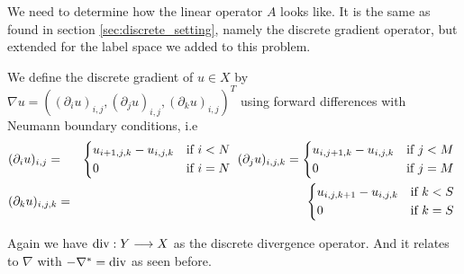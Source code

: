     We need to determine how the linear operator $A$ looks like. It is the same as found in section \ref{sec:discrete_setting}, namely the discrete gradient operator, but extended for the label space we added to this problem.

    \begin{definition} %
    \label{def:discrete_gradient_operator_ms}

        We define the discrete gradient of $u \in X$ by $\nabla u = ((\partial_{i}u)_{i, j}, (\partial_{j}u)_{i, j}, (\partial_{k}u)_{i, j})^{T}$ using forward differences with Neumann boundary conditions, i.e
            \begin{eqnarray}
                &(\partial_{i}u)_{i, j} =&
                    \begin{dcases*}
                        u_{i+1, j, k} - u_{i, j, k} & \textnormal{if $i < N$} \\
                        0 & \textnormal{if $i = N$}
                    \end{dcases*}
                \notag
                (\partial_{j}u)_{i, j, k} =
                    \begin{dcases*}
                        u_{i, j+1, k} - u_{i, j, k} & \textnormal{if $j < M$} \\
                        0 & \textnormal{if $j = M$}
                    \end{dcases*}
                \notag \\
                &(\partial_{k}u)_{i, j, k} =&
                    \begin{dcases*}
                        u_{i, j, k+1} - u_{i, j, k} & \textnormal{if $k < S$} \\
                        0 & \textnormal{if $k = S$}
                    \end{dcases*}
                \notag
            \end{eqnarray}

    \end{definition}

    Again we have $\textnormal{div}: Y \longrightarrow X$ as the discrete divergence operator. And it relates to $\nabla$ with $- \nabla^{\ast} = \textnormal{div}$ as seen before.

